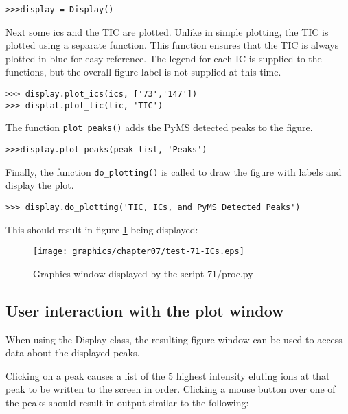 \begin{verbatim}
>>>display = Display()
\end{verbatim}

Next some ics and the TIC are plotted. Unlike in simple plotting, the
TIC is plotted using a separate function. This function ensures that
the TIC is always plotted in blue for easy reference. The legend for
each IC is supplied to the functions, but the overall figure label
is not supplied at this time.

\begin{verbatim}
>>> display.plot_ics(ics, ['73','147'])
>>> displat.plot_tic(tic, 'TIC')
\end{verbatim}

The function {\tt plot\_peaks()} adds the PyMS detected peaks to the
figure.

\begin{verbatim}
>>>display.plot_peaks(peak_list, 'Peaks')
\end{verbatim}

Finally, the function {\tt do\_plotting()} is called to draw the figure with 
labels and display the plot.

\begin{verbatim}
>>> display.do_plotting('TIC, ICs, and PyMS Detected Peaks')
\end{verbatim}

This should result in figure \ref{fig:71-ics} being displayed:

\begin{figure}
  \begin{center}
    \texttt{[image: graphics/chapter07/test-71-ICs.eps]}
  \end{center}
  \caption{Graphics window displayed by the script 71/proc.py}
  \label{fig:71-ics}
\end{figure}

\subsection{User interaction with the plot window}

When using the Display class, the resulting figure window can be used to
access data about the displayed peaks.

Clicking on a peak causes a list of the 5 highest intensity eluting ions
at that peak to be written to the screen in order.  Clicking a mouse
 button over one of the peaks should result in output similar to the
following:

